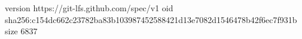 version https://git-lfs.github.com/spec/v1
oid sha256:c154dc662c23782ba83b103987452588421d13e7082d1546478b42f6ec7f931b
size 6837
